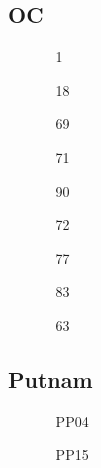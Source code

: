 \documentclass[11pt]{article}
\begin{document}
\subsection{OC}
\begin{itemize}
    \item[\text{Sept 27 Sub. }] \begin{itemize}
        \item[1]
    \end{itemize}
    \item[\text{Oct 4 Sub. }] \begin{itemize}
        \item[18]
    \end{itemize}
    \item[\text{Nov 8 Sub. }] \begin{itemize}
        \item[69] 
        \item[71] 
    \end{itemize}
    \item[\text{Nov 15 Sub. }] \begin{itemize}
        \item[90]
    \end{itemize}
    \item[\text{Nov 22 Sub. }] \begin{itemize}
        \item[72]
        \item[77]
        \item[83] 
    \end{itemize}
    \item[\text{Dec 3 ReSub.}]\begin{itemize}
        \item[63]
    \end{itemize}
\end{itemize}

\subsection{Putnam}
\begin{itemize}
    \item[\text{Nov 29 Sub. }]\begin{itemize}
        \item[PP04]
        \item[PP15] 
    \end{itemize}
\end{itemize}
\end{document}
